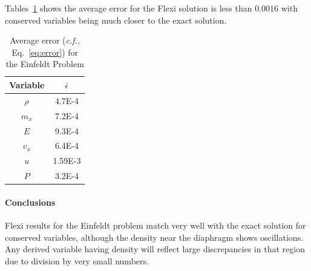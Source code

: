 Tables~\ref{tab:123Eps} shows the average error for the Flexi solution is less than $0.0016$ with conserved variables being much closer to the exact solution.

\begin{table}[h!]
 \centering
 \begin{tabular}{|c|c|} \hline
   Variable & $\bar{\epsilon}$ \\ \hline \hline
   $\rho$ & 4.7E-4 \\
   $m_x$  & 7.2E-4 \\
   $E$      & 9.3E-4 \\ \hline
   $v_x$  & 6.4E-4 \\
   $u$     & 1.59E-3 \\
   $P$     & 3.2E-4 \\ \hline
 \end{tabular}
 \caption{Average error (\textit{c.f.,} Eq.~\ref{eq:error}) for the Einfeldt Problem}\label{tab:123Eps}
\end{table}

\paragraph{Conclusions}
Flexi results for the Einfeldt problem match very well with the exact solution for conserved variables, although the density near the diaphragm shows oscillations. Any derived variable having density will reflect large discrepancies in that region due to division by very small numbers.
